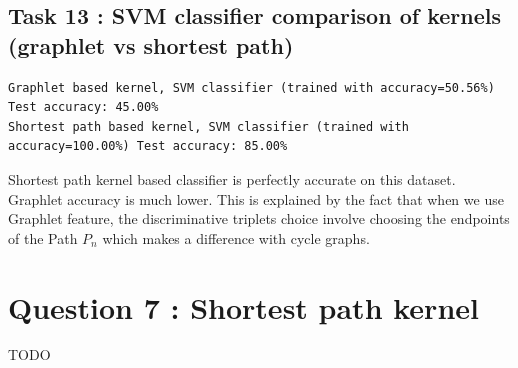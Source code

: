 \documentclass[a4paper]{article}
\begin{document}
\subsection*{Task 13 : SVM classifier comparison of kernels (graphlet vs shortest path)}
\begin{verbatim}
Graphlet based kernel, SVM classifier (trained with accuracy=50.56%) Test accuracy: 45.00%
Shortest path based kernel, SVM classifier (trained with accuracy=100.00%) Test accuracy: 85.00%
\end{verbatim}

Shortest path kernel based classifier is perfectly accurate on this dataset. Graphlet accuracy is much lower.
This is explained by the fact that when we use Graphlet feature, the discriminative triplets choice
involve choosing the endpoints of the Path $P_n$ which makes a difference with cycle graphs.


\section{Question 7 : Shortest path kernel}
TODO



\end{document}
